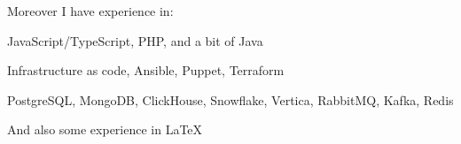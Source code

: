 Moreover I have experience in:
\begin{bulist}
  \item JavaScript/TypeScript, PHP, and a bit of Java
  \item Infrastructure as code, Ansible, Puppet, Terraform
  \item PostgreSQL, MongoDB, ClickHouse, Snowflake, Vertica, RabbitMQ, Kafka,
    Redis
\end{bulist}
And also some experience in \LaTeX

